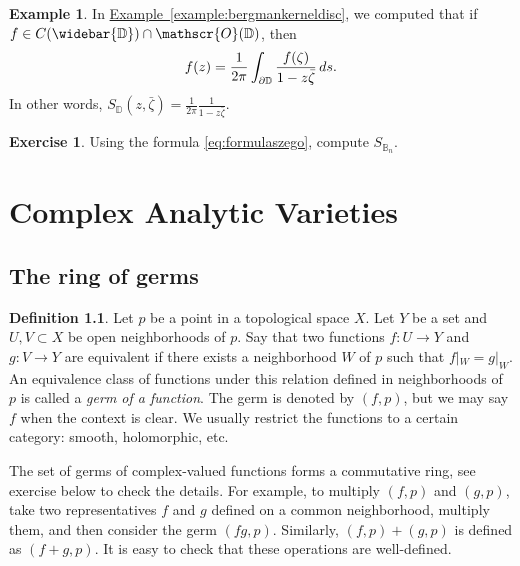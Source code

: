 \documentclass[12pt,openany]{book}
\newcommand{\avoidbreak}{\postdisplaypenalty=100}
\newcommand{\D}{{\mathbb{D}}}
\newcommand{\bB}{{\mathbb{B}}}
\newcommand{\sO}{{\mathscr{O}}}
\newcommand{\myindex}[1]{#1\index{#1}}
\theoremstyle{plain}
\theoremstyle{remark}
\theoremstyle{definition}
\newtheorem{defn}[thm]{Definition}
\newenvironment{exbox}{%
    \def\FrameCommand{\vrule width 1pt \relax\hspace{10pt}}%
    \MakeFramed{\advance\hsize-\width\FrameRestore}%
}{%
    \endMakeFramed
}
\theoremstyle{exercise}
\newtheorem{exercise}{Exercise}[section]
\theoremstyle{example}
\newtheorem{example}[thm]{Example}
\newcommand{\exampleref}[1]{\hyperref[#1]{Example~\ref*{#1}}}
\begin{document}
\begin{example}
In \exampleref{example:bergmankerneldisc}, we computed that
if $f \in C(\widebar{\D}) \cap \sO(\D)$, then
\begin{equation*}
f(z) = \frac{1}{2\pi} \int_{\partial \D} \frac{f(\zeta)}{1-z\bar{\zeta}} \, ds .
\avoidbreak
\end{equation*}
In other words, $S_{\D}(z,\bar{\zeta}) =
\frac{1}{2\pi}
\frac{1}{1-z\bar{\zeta}}$.
\end{example}

\begin{exbox}
\begin{exercise}
Using the formula \eqref{eq:formulaszego}, compute $S_{\bB_n}$.
\end{exercise}
\end{exbox}


\chapter{Complex Analytic Varieties} \label{ch:analyticvarieties}


\section{The ring of germs}

\begin{defn}
Let $p$ be a point in a topological space $X$.  Let $Y$ be a set and
$U, V \subset X$ be open neighborhoods of $p$.  Say that
two functions $f \colon U \to Y$ and
$g \colon V \to Y$ are equivalent if there exists a neighborhood
$W$ of $p$ such that $f|_W = g|_W$.
An equivalence class of functions under this relation defined in neighborhoods of $p$
is called a \emph{\myindex{germ of a function}}.
%
The germ is denoted by $(f,p)$, but we may say $f$ when
the context is clear.
We usually restrict the functions to a certain category:
smooth, holomorphic, etc.
\end{defn}

The set of germs of complex-valued functions forms a
commutative ring, see exercise below to check the details.
For example, to multiply $(f,p)$ and $(g,p)$, take two representatives
$f$ and $g$ defined on a common neighborhood, multiply them, and
then consider the germ $(fg,p)$.  Similarly, $(f,p) + (g,p)$ is
defined as $(f+g,p)$.  It is easy to check that these operations are
well-defined.
\end{document}

